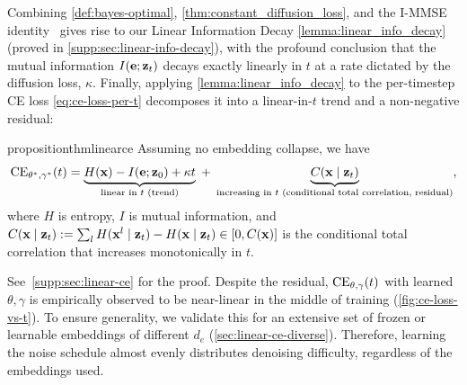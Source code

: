 \documentclass{article}
\begin{document}
%

Combining \cref{def:bayes-optimal}, \cref{thm:constant_diffusion_loss}, and the I-MMSE identity~\citep{guo2005mutual} gives rise to our Linear Information Decay \cref{lemma:linear_info_decay} (proved in \cref{supp:sec:linear-info-decay}), with the profound conclusion that the mutual information $I({\mathbf e}; {\mathbf z}_t)$ decays exactly linearly in $t$ at a rate dictated by the diffusion loss, $\kappa$. Finally, applying \cref{lemma:linear_info_decay} to the per-timestep CE loss \cref{eq:ce-loss-per-t} decomposes it into a linear-in-$t$ trend and a non-negative residual:
%
%

%

\vspace{0.5em}
\begin{restatable}{proposition}{thmlinearce}
\label{thm:linear_ce}
    Assuming no embedding collapse, we have
    \begin{equation}
        \operatorname{CE}_{\theta^*, \gamma^*}(t) = \underbrace{H({\mathbf x}) - I({\mathbf e}; {\mathbf z}_0) + \kappa t}_{\text{linear in } t \text{ (trend)}} \;+\; \underbrace{C({\mathbf x} \mid {\mathbf z}_t)}_{\text{increasing in $t$ (conditional total correlation, residual)}},
    \end{equation}
    \vspace{-1pt}where $H$ is entropy, $I$ is mutual information, and $C({\mathbf x}\mid{\mathbf z}_t) := \sum_l H({\mathbf x}^l\mid{\mathbf z}_t) - H({\mathbf x}\mid{\mathbf z}_t) \in [0,C({\mathbf x})]$ is the conditional total correlation that increases monotonically in $t$. %
\end{restatable}

%

See~\cref{supp:sec:linear-ce} for the proof. Despite the residual, $\operatorname{CE}_{\theta, \gamma}(t)$ with learned $\theta,\gamma$ is empirically observed to be near-linear in the middle of training (\cref{fig:ce-loss-vs-t}). To ensure generality, we validate this for an extensive set of frozen or learnable embeddings of different $d_e$ (\cref{sec:linear-ce-diverse}). Therefore, learning the noise schedule almost evenly distributes denoising difficulty, regardless of the embeddings used. 

%
%

%

%

%



%

%

%

%
\end{document}
